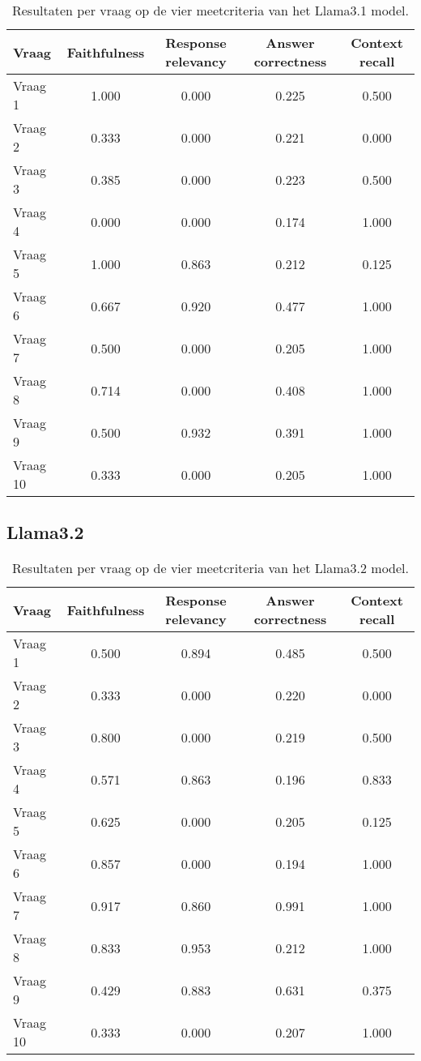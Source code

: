 \begin{table}[H]
    \centering
    \begin{tabular}{|l|c|c|c|c|}
        \hline
        \textbf{Vraag} & \textbf{Faithfulness} & \textbf{Response relevancy} & \textbf{Answer correctness} & \textbf{Context recall} \\
        \hline
        Vraag 1 & 1.000 & 0.000 & 0.225 & 0.500 \\
        Vraag 2 & 0.333 & 0.000 & 0.221 & 0.000 \\
        Vraag 3 & 0.385 & 0.000 & 0.223 & 0.500 \\
        Vraag 4 & 0.000 & 0.000 & 0.174 & 1.000 \\
        Vraag 5 & 1.000 & 0.863 & 0.212 & 0.125 \\
        Vraag 6 & 0.667 & 0.920 & 0.477 & 1.000 \\
        Vraag 7 & 0.500 & 0.000 & 0.205 & 1.000 \\
        Vraag 8 & 0.714 & 0.000 & 0.408 & 1.000 \\
        Vraag 9 & 0.500 & 0.932 & 0.391 & 1.000 \\
        Vraag 10 & 0.333 & 0.000 & 0.205 & 1.000 \\
        \hline
    \end{tabular}
    \caption{Resultaten per vraag op de vier meetcriteria van het Llama3.1 model.}
    \label{tab:resultaten_vragen_llama3.1}
\end{table}

\subsection{Llama3.2}

\begin{table}[H]
    \centering
    \begin{tabular}{|l|c|c|c|c|}
        \hline
        \textbf{Vraag} & \textbf{Faithfulness} & \textbf{Response relevancy} & \textbf{Answer correctness} & \textbf{Context recall} \\
        \hline
        Vraag 1  & 0.500 & 0.894 & 0.485 & 0.500 \\
        Vraag 2  & 0.333 & 0.000 & 0.220 & 0.000 \\
        Vraag 3  & 0.800 & 0.000 & 0.219 & 0.500 \\
        Vraag 4  & 0.571 & 0.863 & 0.196 & 0.833 \\
        Vraag 5  & 0.625 & 0.000 & 0.205 & 0.125 \\
        Vraag 6  & 0.857 & 0.000 & 0.194 & 1.000 \\
        Vraag 7  & 0.917 & 0.860 & 0.991 & 1.000 \\
        Vraag 8  & 0.833 & 0.953 & 0.212 & 1.000 \\
        Vraag 9  & 0.429 & 0.883 & 0.631 & 0.375 \\
        Vraag 10 & 0.333 & 0.000 & 0.207 & 1.000 \\
        \hline
    \end{tabular}
    \caption{Resultaten per vraag op de vier meetcriteria van het Llama3.2 model.}
    \label{tab:resultaten_vragen_llama3.2}
\end{table}

